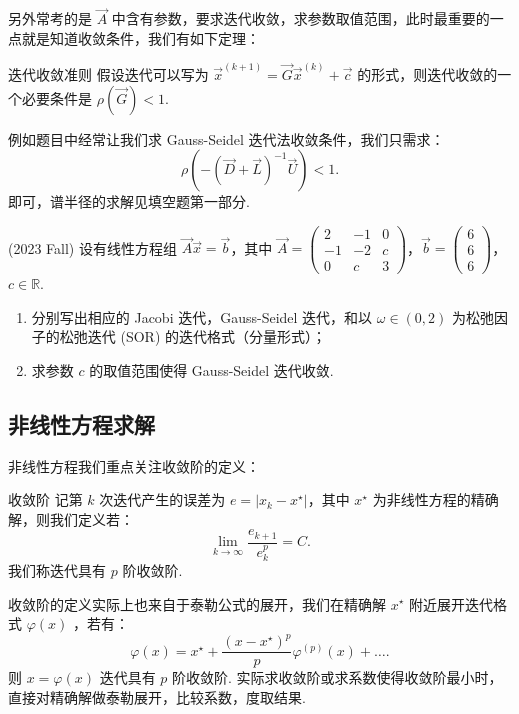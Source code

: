 另外常考的是 $\vec{A}$ 中含有参数，要求迭代收敛，求参数取值范围，此时最重要的一点就是知道收敛条件，我们有如下定理：
\begin{theorem}{迭代收敛准则}
    假设迭代可以写为 $\vec{x}^{(k+1)} = \vec{G}\vec{x}^{(k)}+\vec{c}$ 的形式，则迭代收敛的一个必要条件是 $\rho(\vec{G}) <1$.
\end{theorem}
例如题目中经常让我们求 Gauss-Seidel 迭代法收敛条件，我们只需求：
\[
    \rho(-(\vec{D}+\vec{L})^{-1}\vec{U}) <1.
\]
即可，谱半径的求解见填空题第一部分.
\begin{problembox}
    \begin{example}
    (2023 Fall) 设有线性方程组 $\vec{A}\vec{x} = \vec{b}$，其中 $\vec{A} = \begin{pmatrix}
        2 & -1 & 0 \\ -1 & -2 & c \\ 0 & c & 3
    \end{pmatrix}$，$\vec{b} = \begin{pmatrix}
        6 \\ 6 \\ 6
    \end{pmatrix}$，$c\in \mathbb{R}$.
    \begin{enumerate}
        \item 分别写出相应的 Jacobi 迭代，Gauss-Seidel 迭代，和以 $\omega \in (0,2)$ 为松弛因子的松弛迭代 (SOR) 的迭代格式（分量形式）；
        \item 求参数 $c$ 的取值范围使得 Gauss-Seidel 迭代收敛.
    \end{enumerate}
    \end{example}
    \begin{solution}
        
    \end{solution}
\end{problembox}


\subsection*{非线性方程求解}
非线性方程我们重点关注收敛阶的定义：
\begin{definition}{收敛阶}{}
    记第 $k$ 次迭代产生的误差为 $e = |x_k -x^\star|$，其中 $x^\star$ 为非线性方程的精确解，则我们定义若：
    \[
        \lim_{k\to \infty} \dfrac{e_{k+1}}{e^p_k} = C.
    \]
    我们称迭代具有 $p$ 阶收敛阶.
\end{definition}

收敛阶的定义实际上也来自于泰勒公式的展开，我们在精确解 $x^\star$ 附近展开迭代格式 $\varphi(x)$ ，若有：
\[
    \varphi(x) = x^\star + \dfrac{(x-x^\star)^p}{p}\varphi^{(p)}(x) +\dots.
\]
则 $x= \varphi(x)$ 迭代具有 $p$ 阶收敛阶. {\color{red} 实际求收敛阶或求系数使得收敛阶最小时，直接对精确解做泰勒展开，比较系数，度取结果.}

